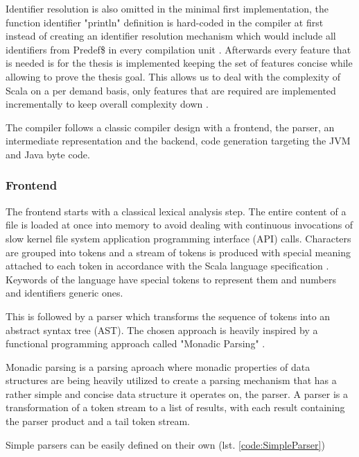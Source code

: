 \documentclass{VUMIFPSbakalaurinis}
\begin{document}
Identifier resolution is also omitted in the minimal first implementation, the function identifier "println" definition is hard-coded in the compiler at first instead of creating an identifier resolution mechanism which would include all identifiers from Predef\$ in every compilation unit \cite{Predef}.
Afterwards every feature that is needed is for the thesis is implemented keeping the set of features concise while allowing to prove the thesis goal.
This allows us to deal with the complexity of Scala on a per demand basis, only features that are required are implemented incrementally to keep overall complexity down \cite{IncrementalCompiler}.

The compiler follows a classic compiler design with a frontend, the parser, an intermediate representation and the backend, code generation targeting the JVM and Java byte code.

\subsubsection{Frontend}

The frontend starts with a classical lexical analysis step.
The entire content of a file is loaded at once into memory to avoid dealing with continuous invocations of slow kernel file system application programming interface (API) calls.
Characters are grouped into tokens and a stream of tokens is produced with special meaning attached to each token in accordance with the Scala language specification \cite{ScalaSpec}.
Keywords of the language have special tokens to represent them and numbers and identifiers generic ones.

This is followed by a parser which transforms the sequence of tokens into an abstract syntax tree (AST).
The chosen approach is heavily inspired by a functional programming approach called "Monadic Parsing" \cite{MonadicParsing}.

Monadic parsing is a parsing aproach where monadic properties of data structures are being heavily utilized to create a parsing mechanism that has a rather simple and concise data structure it operates on, the parser.
A parser is a transformation of a token stream to a list of results, with each result containing the parser product and a tail token stream.

Simple parsers can be easily defined on their own (lst. \ref{code:SimpleParser})

\end{document}
